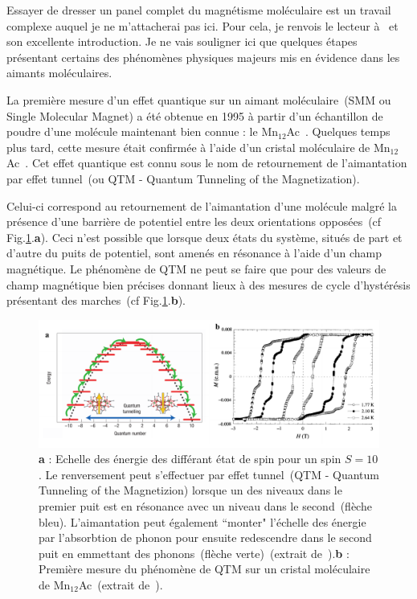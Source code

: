 Essayer de dresser un panel complet du magnétisme moléculaire est un travail complexe auquel je ne m'attacherai pas ici. Pour cela, je renvois le lecteur à~\cite{Gatteschi2006} et son excellente introduction. Je ne vais souligner ici que quelques étapes présentant certains des phénomènes physiques majeurs mis en évidence dans les aimants moléculaires.

La première mesure d'un effet quantique sur un aimant moléculaire~(SMM ou Single Molecular Magnet) a été obtenue en 1995 à partir d'un échantillon de poudre d'une molécule maintenant bien connue : le Mn$_{12}$Ac~\cite{Friedman1996}. Quelques temps plus tard, cette mesure était confirmée à l'aide d'un cristal moléculaire de Mn$_{12}$Ac~\cite{Thomas1996}. Cet effet quantique est connu sous le nom de retournement de l'aimantation par effet tunnel~(ou QTM - Quantum Tunneling of the Magnetization).

Celui-ci correspond au retournement de l'aimantation d'une molécule malgré la présence d'une barrière de potentiel entre les deux orientations opposées~(cf Fig.\ref{MolecularMag}.\textbf{a}). Ceci n'est possible que lorsque deux états du système, situés de part et d'autre du puits de potentiel, sont amenés en résonance à l'aide d'un champ magnétique. Le phénomène de QTM ne peut se faire que pour des valeurs de champ magnétique bien précises donnant lieux à des mesures de cycle d'hystérésis présentant des marches~(cf Fig.\ref{MolecularMag}.\textbf{b}).

\begin{figure}
\centering \includegraphics[scale=0.45]{Spintronique/MolecularMag/MolecularMag.pdf}
\caption{ \textbf{a} : Echelle des énergie des différant état de spin pour un spin $S=10$. Le renversement peut s'effectuer par effet tunnel~(QTM - Quantum Tunneling of the Magnetizion) lorsque un des niveaux dans le premier puit est en résonance avec un niveau dans le second~(flèche bleu). L'aimantation peut également ``monter" l'échelle des énergie par l'absorbtion de phonon pour ensuite redescendre dans le second puit en emmettant des phonons~(flèche verte)~(extrait de~\cite{Bogani2008}).\textbf{b} : Première mesure du phénomène de QTM sur un cristal moléculaire de Mn$_{12}$Ac~(extrait de~\cite{Thomas1996}).}
\label{MolecularMag}
\end{figure}

